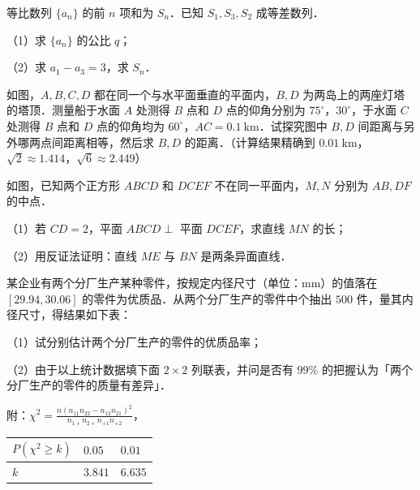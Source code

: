 \begin{question}
等比数列 $\{a_n\}$ 的前 $n$ 项和为 $S_n$．已知 $S_1,S_3,S_2$ 成等差数列．

（1）求 $\{a_n\}$ 的公比 $q$；

（2）求 $a_1-a_3=3$，求 $S_n$．

\Needspace{0.4\textheight}
\end{question}
\begin{question}
如图，$A,B,C,D$ 都在同一个与水平面垂直的平面内，$B,D$ 为两岛上的两座灯塔的塔顶．测量船于水面 $A$ 处测得 $B$ 点和 $D$ 点的仰角分别为 $75^\circ$，$30^\circ$，于水面 $C$ 处测得 $B$ 点和 $D$ 点的仰角均为 $60^\circ$，$AC=0.1\ \mathrm{km}$．试探究图中 $B,D$ 间距离与另外哪两点间距离相等，然后求 $B,D$ 的距离．（计算结果精确到 $0.01\ \mathrm{km}$，$\sqrt2\approx1.414$，$\sqrt6\approx2.449$）
\nopagebreak[4]
\begin{center}\end{center}
\nopagebreak[4]
\Needspace{0.4\textheight}
\end{question}
\begin{question}
如图，已知两个正方形 $ABCD$ 和 $DCEF$ 不在同一平面内，$M,N$ 分别为 $AB,DF$ 的中点．

（1）若 $CD=2$，平面 $ABCD\perp$ 平面 $DCEF$，求直线 $MN$ 的长；

（2）用反证法证明：直线 $ME$ 与 $BN$ 是两条异面直线．
\nopagebreak[4]
\begin{center}\end{center}
\nopagebreak[4]
\Needspace{0.4\textheight}
\end{question}
\begin{question}
某企业有两个分厂生产某种零件，按规定内径尺寸（单位：$\mathrm{mm}$）的值落在 $[29.94,30.06]$ 的零件为优质品．从两个分厂生产的零件中个抽出 $500$ 件，量其内径尺寸，得结果如下表：
\nopagebreak[4]
\begin{center}\end{center}
\nopagebreak[4]
（1）试分别估计两个分厂生产的零件的优质品率；

（2）由于以上统计数据填下面 $2\times2$ 列联表，并问是否有 $99\%$ 的把握认为「两个分厂生产的零件的质量有差异」．
\nopagebreak[4]
\begin{center}\end{center}
\nopagebreak[4]
附：$\chi^2=\frac{n(n_{11}n_{22}-n_{12}n_{21})^2}{n_{1+}n_{2+}n_{+1}n_{+2}}$，

\begin{center}
\begin{tabular}{lll}
\toprule
$P(\chi^2\geqslant k)$ & $0.05$ & $0.01$ \\
\midrule
$k$ & $3.841$ & $6.635$ \\
\bottomrule
\end{tabular}
\end{center}

\end{question}
